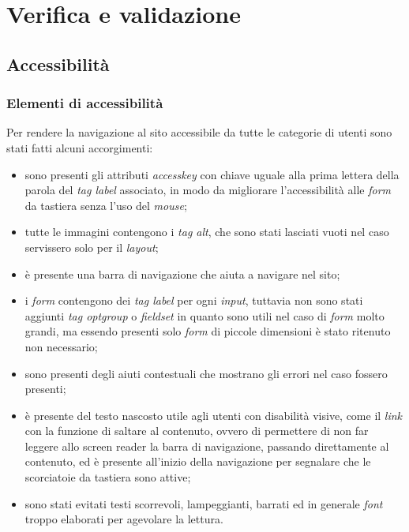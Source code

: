 
\chapter{Verifica e validazione}
\label{cap:verifica-validazione}

\section{Accessibilità}
\subsection{Elementi di accessibilità}
Per rendere la navigazione al sito accessibile da tutte le categorie di utenti
sono stati fatti alcuni accorgimenti:
\begin{itemize}
    \item sono presenti gli attributi \textit{accesskey} con chiave uguale alla
          prima lettera della parola del \textit{tag label} associato, in modo da
          migliorare l'accessibilità alle \textit{form} da tastiera senza l'uso del
          \textit{mouse};
    \item tutte le immagini contengono i \textit{tag alt}, che sono stati
          lasciati vuoti nel caso servissero solo per il \textit{layout};
    \item è presente una barra di navigazione che aiuta a navigare nel sito;
    \item i \textit{form} contengono dei \textit{tag label} per ogni
          \textit{input}, tuttavia non sono stati aggiunti \textit{tag optgroup} o
          \textit{fieldset} in quanto sono utili nel caso di \textit{form} molto grandi,
          ma essendo presenti solo \textit{form} di piccole dimensioni è stato ritenuto
          non necessario;
    \item sono presenti degli aiuti contestuali che mostrano gli errori nel
          caso fossero presenti;
    \item è presente del testo nascosto utile agli utenti con disabilità
          visive, come il \textit{link} con la funzione  di saltare al contenuto, ovvero
          di permettere di non far leggere allo \gls{screen reader} la barra di
          navigazione, passando direttamente al contenuto, ed è presente all'inizio della
          navigazione per segnalare che le scorciatoie da tastiera sono attive;
    \item sono stati evitati testi scorrevoli, lampeggianti, barrati ed in
          generale \textit{font} troppo elaborati per agevolare la lettura.
\end{itemize}

